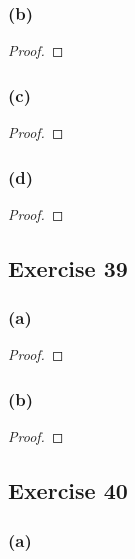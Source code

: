 \documentclass[14pt]{extarticle}
\begin{document}
\subsubsection{(b)}

\begin{proof}

\end{proof}

\subsubsection{(c)}

\begin{proof}

\end{proof}

\subsubsection{(d)}

\begin{proof}

\end{proof}

\subsection{Exercise 39}

\subsubsection{(a)}

\begin{proof}

\end{proof}

\subsubsection{(b)}

\begin{proof}

\end{proof}

\subsection{Exercise 40}

\subsubsection{(a)}
\end{document}
